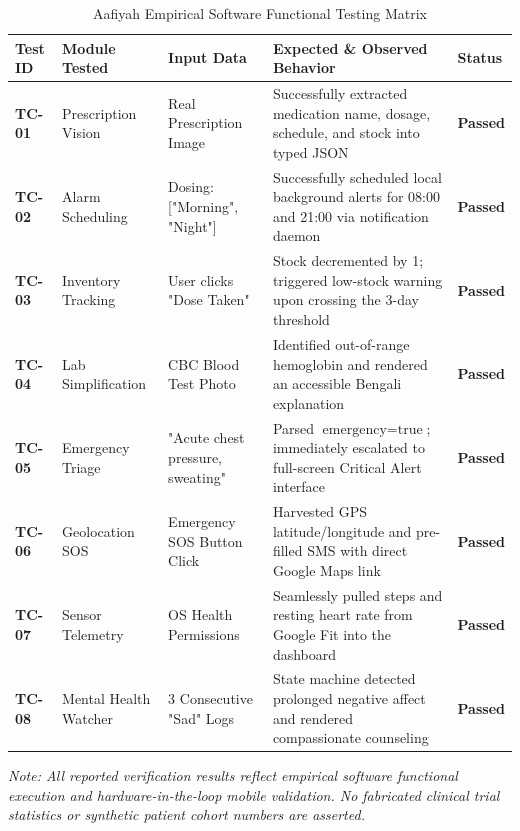 \documentclass[12pt,a4paper,oneside]{report}
\begin{document}
\begin{table}[htbp]
\centering
\caption{Aafiyah Empirical Software Functional Testing Matrix}
\label{tab:test_matrix_en}
\begin{tabularx}{\textwidth}{C{1.6cm} L{3.5cm} L{3.2cm} X C{1.8cm}}
\toprule
\textbf{Test ID} & \textbf{Module Tested} & \textbf{Input Data} & \textbf{Expected \& Observed Behavior} & \textbf{Status} \\
\midrule
\textbf{TC-01} & Prescription Vision & Real Prescription Image & Successfully extracted medication name, dosage, schedule, and stock into typed JSON & \textbf{Passed} \\
\textbf{TC-02} & Alarm Scheduling & Dosing: ["Morning", "Night"] & Successfully scheduled local background alerts for 08:00 and 21:00 via notification daemon & \textbf{Passed} \\
\textbf{TC-03} & Inventory Tracking & User clicks "Dose Taken" & Stock decremented by 1; triggered low-stock warning upon crossing the 3-day threshold & \textbf{Passed} \\
\textbf{TC-04} & Lab Simplification & CBC Blood Test Photo & Identified out-of-range hemoglobin and rendered an accessible Bengali explanation & \textbf{Passed} \\
\textbf{TC-05} & Emergency Triage & "Acute chest pressure, sweating" & Parsed $\text{emergency}=\text{true}$; immediately escalated to full-screen Critical Alert interface & \textbf{Passed} \\
\textbf{TC-06} & Geolocation SOS & Emergency SOS Button Click & Harvested GPS latitude/longitude and pre-filled SMS with direct Google Maps link & \textbf{Passed} \\
\textbf{TC-07} & Sensor Telemetry & OS Health Permissions & Seamlessly pulled steps and resting heart rate from Google Fit into the dashboard & \textbf{Passed} \\
\textbf{TC-08} & Mental Health Watcher & 3 Consecutive "Sad" Logs & State machine detected prolonged negative affect and rendered compassionate counseling & \textbf{Passed} \\
\bottomrule
\end{tabularx}
\end{table}

\textit{Note: All reported verification results reflect empirical software functional execution and hardware-in-the-loop mobile validation. No fabricated clinical trial statistics or synthetic patient cohort numbers are asserted.}

\end{document}
